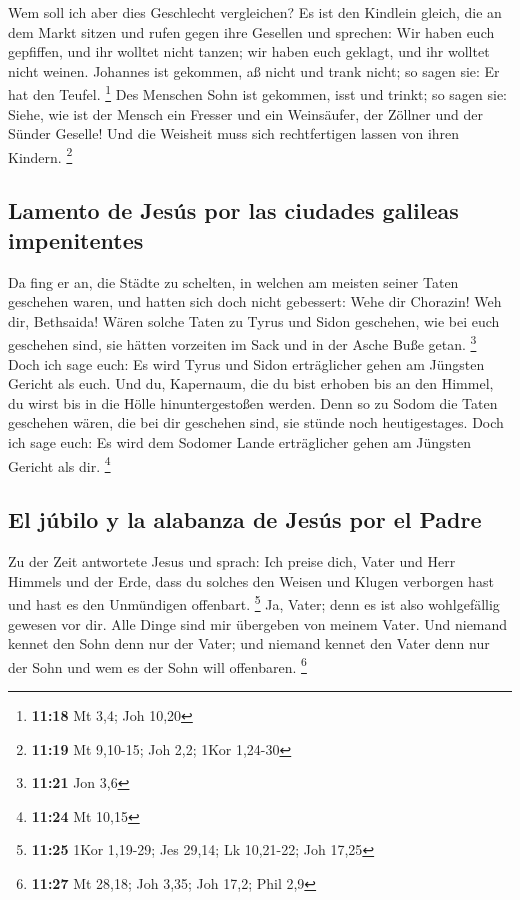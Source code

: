  Wem soll ich aber dies Geschlecht vergleichen? Es ist
den Kindlein gleich, die an dem Markt sitzen und rufen gegen ihre
Gesellen  und sprechen: Wir haben euch gepfiffen, und ihr
wolltet nicht tanzen; wir haben euch geklagt, und ihr wolltet nicht
weinen.  Johannes ist gekommen, aß nicht und trank nicht;
so sagen sie: Er hat den Teufel. \footnote{\textbf{11:18} Mt 3,4; Joh
  10,20}  Des Menschen Sohn ist gekommen, isst und
trinkt; so sagen sie: Siehe, wie ist der Mensch ein Fresser und ein
Weinsäufer, der Zöllner und der Sünder Geselle! Und die Weisheit muss
sich rechtfertigen lassen von ihren Kindern. \footnote{\textbf{11:19} Mt
  9,10-15; Joh 2,2; 1Kor 1,24-30}

\hypertarget{lamento-de-jesuxfas-por-las-ciudades-galileas-impenitentes}{%
\subsection{Lamento de Jesús por las ciudades galileas
impenitentes}\label{lamento-de-jesuxfas-por-las-ciudades-galileas-impenitentes}}

 Da fing er an, die Städte zu schelten, in welchen am
meisten seiner Taten geschehen waren, und hatten sich doch nicht
gebessert:  Wehe dir Chorazin! Weh dir, Bethsaida! Wären
solche Taten zu Tyrus und Sidon geschehen, wie bei euch geschehen sind,
sie hätten vorzeiten im Sack und in der Asche Buße getan. \footnote{\textbf{11:21}
  Jon 3,6}  Doch ich sage euch: Es wird Tyrus und Sidon
erträglicher gehen am Jüngsten Gericht als euch.  Und du,
Kapernaum, die du bist erhoben bis an den Himmel, du wirst bis in die
Hölle hinuntergestoßen werden. Denn so zu Sodom die Taten geschehen
wären, die bei dir geschehen sind, sie stünde noch heutigestages.
 Doch ich sage euch: Es wird dem Sodomer Lande
erträglicher gehen am Jüngsten Gericht als dir. \footnote{\textbf{11:24}
  Mt 10,15}

\hypertarget{el-juxfabilo-y-la-alabanza-de-jesuxfas-por-el-padre}{%
\subsection{El júbilo y la alabanza de Jesús por el
Padre}\label{el-juxfabilo-y-la-alabanza-de-jesuxfas-por-el-padre}}

 Zu der Zeit antwortete Jesus und sprach: Ich preise
dich, Vater und Herr Himmels und der Erde, dass du solches den Weisen
und Klugen verborgen hast und hast es den Unmündigen offenbart.
\footnote{\textbf{11:25} 1Kor 1,19-29; Jes 29,14; Lk 10,21-22; Joh 17,25}
 Ja, Vater; denn es ist also wohlgefällig gewesen vor
dir.  Alle Dinge sind mir übergeben von meinem Vater. Und
niemand kennet den Sohn denn nur der Vater; und niemand kennet den Vater
denn nur der Sohn und wem es der Sohn will offenbaren. \footnote{\textbf{11:27}
  Mt 28,18; Joh 3,35; Joh 17,2; Phil 2,9}

